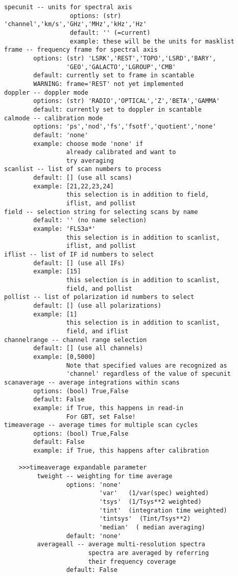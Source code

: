 \begin{verbatim}
specunit -- units for spectral axis
                  options: (str) 'channel','km/s','GHz','MHz','kHz','Hz'
                  default: '' (=current)
                  example: these will be the units for masklist
frame -- frequency frame for spectral axis
        options: (str) 'LSRK','REST','TOPO','LSRD','BARY',
                 'GEO','GALACTO','LGROUP','CMB'
        default: currently set to frame in scantable
        WARNING: frame='REST' not yet implemented    
doppler -- doppler mode
        options: (str) 'RADIO','OPTICAL','Z','BETA','GAMMA'
        default: currently set to doppler in scantable
calmode -- calibration mode
        options: 'ps','nod','fs','fsotf','quotient','none'
        default: 'none'
        example: choose mode 'none' if
                 already calibrated and want to
                 try averaging
scanlist -- list of scan numbers to process
        default: [] (use all scans)
        example: [21,22,23,24]
                 this selection is in addition to field,
                 iflist, and pollist
field -- selection string for selecting scans by name
        default: '' (no name selection)
        example: 'FLS3a*'
                 this selection is in addition to scanlist,
                 iflist, and pollist
iflist -- list of IF id numbers to select
        default: [] (use all IFs)
        example: [15]
                 this selection is in addition to scanlist,
                 field, and pollist
pollist -- list of polarization id numbers to select
        default: [] (use all polarizations)
        example: [1]
                 this selection is in addition to scanlist,
                 field, and iflist
channelrange -- channel range selection
        default: [] (use all channels)
        example: [0,5000]
                 Note that specified values are recognized as
                 'channel' regardless of the value of specunit
scanaverage -- average integrations within scans
        options: (bool) True,False
        default: False
        example: if True, this happens in read-in
                 For GBT, set False!
timeaverage -- average times for multiple scan cycles
        options: (bool) True,False
        default: False
        example: if True, this happens after calibration
        
    >>>timeaverage expandable parameter
         tweight -- weighting for time average
                 options: 'none'
                          'var'   (1/var(spec) weighted)
                          'tsys'  (1/Tsys**2 weighted)
                          'tint'  (integration time weighted)
                          'tintsys'  (Tint/Tsys**2)
                          'median'  ( median averaging)
                 default: 'none'
         averageall -- average multi-resolution spectra
                       spectra are averaged by referring
                       their frequency coverage
                 default: False


\end{verbatim}
